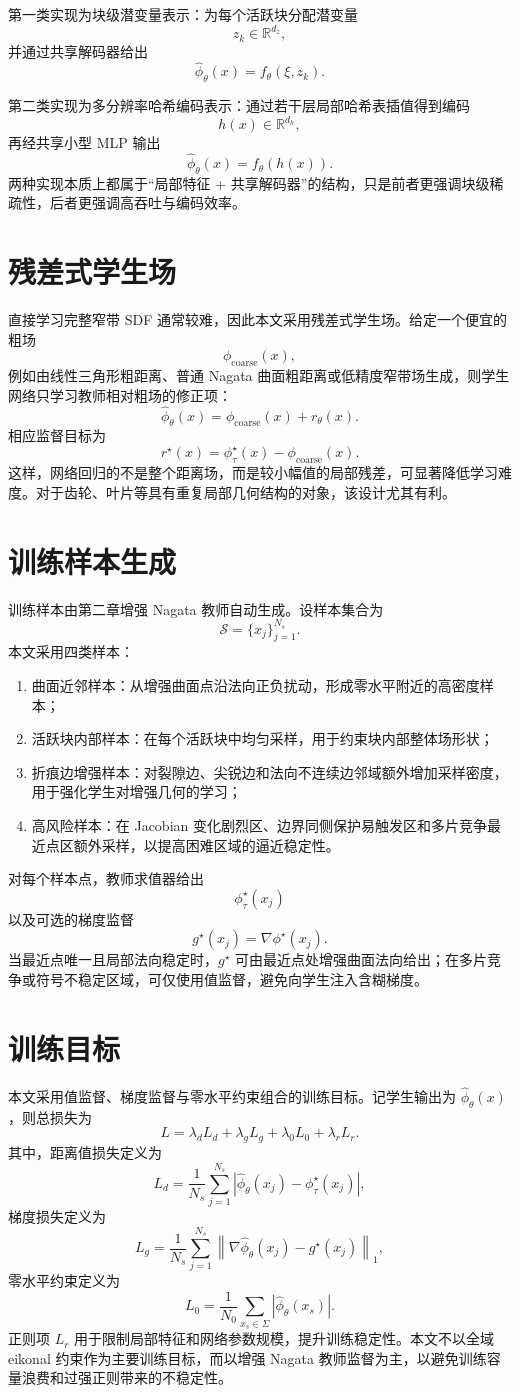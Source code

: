 \documentclass[12pt,oneside]{ctexbook}
\begin{document}
第一类实现为块级潜变量表示：为每个活跃块分配潜变量
\[
z_k\in\mathbb R^{d_z},
\]
并通过共享解码器给出
\[
\hat\phi_\theta(x)=f_\theta(\xi,z_k).
\]

第二类实现为多分辨率哈希编码表示：通过若干层局部哈希表插值得到编码
\[
h(x)\in\mathbb R^{d_h},
\]
再经共享小型 MLP 输出
\[
\hat\phi_\theta(x)=f_\theta(h(x)).
\]
两种实现本质上都属于“局部特征 + 共享解码器”的结构，只是前者更强调块级稀疏性，后者更强调高吞吐与编码效率。

\section{残差式学生场}
直接学习完整窄带 SDF 通常较难，因此本文采用残差式学生场。给定一个便宜的粗场
\[
\phi_{\mathrm{coarse}}(x),
\]
例如由线性三角形粗距离、普通 Nagata 曲面粗距离或低精度窄带场生成，则学生网络只学习教师相对粗场的修正项：
\[
\hat\phi_\theta(x)=\phi_{\mathrm{coarse}}(x)+r_\theta(x).
\]
相应监督目标为
\[
r^\star(x)=\phi^\star_\tau(x)-\phi_{\mathrm{coarse}}(x).
\]
这样，网络回归的不是整个距离场，而是较小幅值的局部残差，可显著降低学习难度。对于齿轮、叶片等具有重复局部几何结构的对象，该设计尤其有利。

\section{训练样本生成}
训练样本由第二章增强 Nagata 教师自动生成。设样本集合为
\[
\mathcal S=\{x_j\}_{j=1}^{N_s}.
\]
本文采用四类样本：
\begin{enumerate}[label=\arabic*)]
  \item 曲面近邻样本：从增强曲面点沿法向正负扰动，形成零水平附近的高密度样本；
  \item 活跃块内部样本：在每个活跃块中均匀采样，用于约束块内部整体场形状；
  \item 折痕边增强样本：对裂隙边、尖锐边和法向不连续边邻域额外增加采样密度，用于强化学生对增强几何的学习；
  \item 高风险样本：在 Jacobian 变化剧烈区、边界同侧保护易触发区和多片竞争最近点区额外采样，以提高困难区域的逼近稳定性。
\end{enumerate}
对每个样本点，教师求值器给出
\[
\phi^\star_\tau(x_j)
\]
以及可选的梯度监督
\[
g^\star(x_j)=\nabla\phi^\star(x_j).
\]
当最近点唯一且局部法向稳定时，$g^\star$ 可由最近点处增强曲面法向给出；在多片竞争或符号不稳定区域，可仅使用值监督，避免向学生注入含糊梯度。

\section{训练目标}
本文采用值监督、梯度监督与零水平约束组合的训练目标。记学生输出为 $\hat\phi_\theta(x)$，则总损失为
\[
L=\lambda_d L_d+\lambda_g L_g+\lambda_0 L_0+\lambda_r L_r.
\]
其中，距离值损失定义为
\[
L_d=\frac{1}{N_s}\sum_{j=1}^{N_s}\left|\hat\phi_\theta(x_j)-\phi^\star_\tau(x_j)\right|,
\]
梯度损失定义为
\[
L_g=\frac{1}{N_s}\sum_{j=1}^{N_s}\left\|\nabla\hat\phi_\theta(x_j)-g^\star(x_j)\right\|_1,
\]
零水平约束定义为
\[
L_0=\frac{1}{N_0}\sum_{x_s\in\Sigma}\left|\hat\phi_\theta(x_s)\right|.
\]
正则项 $L_r$ 用于限制局部特征和网络参数规模，提升训练稳定性。本文不以全域 eikonal 约束作为主要训练目标，而以增强 Nagata 教师监督为主，以避免训练容量浪费和过强正则带来的不稳定性。
\end{document}
